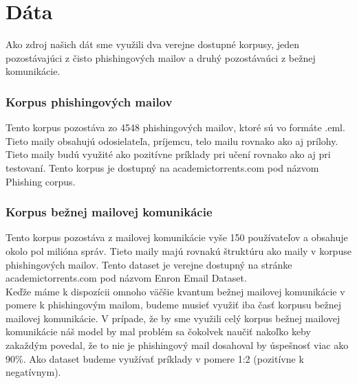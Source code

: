\documentclass[12pt]{article}
\begin{document}
\section*{Dáta}
Ako zdroj našich dát sme využili dva verejne dostupné korpusy, jeden pozostávajúci z čisto phishingových mailov a druhý pozostávaúci z bežnej komunikácie.
\subsubsection*{Korpus phishingových mailov}
Tento korpus pozostáva zo 4548 phishingových mailov, ktoré sú vo formáte .eml. Tieto maily obsahujú odosielateľa, príjemcu, telo mailu rovnako ako aj prílohy. Tieto maily budú využité ako pozitívne príklady pri učení rovnako ako aj pri testovaní. Tento korpus je dostupný na academictorrents.com pod názvom Phishing corpus.
\subsubsection*{Korpus bežnej mailovej komunikácie}
Tento korpus pozostáva z mailovej komunikácie vyše 150 používateľov a obsahuje okolo pol milióna správ. Tieto maily majú rovnakú štruktúru ako maily v korpuse phishingových mailov. Tento dataset je verejne dostupný na stránke academictorrents.com pod názvom Enron Email Dataset.\\

Keďže máme k dispozícii omnoho väčšie kvantum bežnej mailovej komunikácie v pomere k phishingovým mailom, budeme musieť využiť iba časť korpusu bežnej mailovej komunikácie. V prípade, že by sme využili celý korpus bežnej mailovej komunikácie náš model by mal problém sa čokolvek naučiť nakoľko keby zakaždým povedal, že to nie je phishingový mail dosahoval by úspešnosť viac ako 90\%. Ako dataset budeme využívať príklady v pomere 1:2 (pozitívne k negatívnym).
\end{document}
